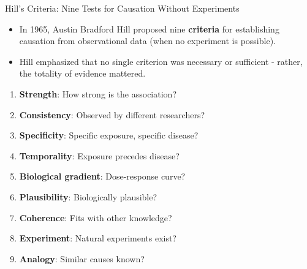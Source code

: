 \documentclass{beamer}
\begin{document}
	\begin{frame}{Hill's Criteria: Nine Tests for Causation Without Experiments}
		\begin{itemize}
			\item In 1965, Austin Bradford Hill proposed nine \textbf{criteria} for establishing causation from observational data (when no experiment is possible).
			\item Hill emphasized that no single criterion was necessary or sufficient - rather, the totality of evidence mattered.
		\end{itemize}
		
		\begin{example}
			\scriptsize
			\begin{enumerate}
				\item \textbf{Strength}: How strong is the association?
				\item \textbf{Consistency}: Observed by different researchers?
				\item \textbf{Specificity}: Specific exposure, specific disease?
				\item \textbf{Temporality}: Exposure precedes disease?
				\item \textbf{Biological gradient}: Dose-response curve?
				\item \textbf{Plausibility}: Biologically plausible?
				\item \textbf{Coherence}: Fits with other knowledge?
				\item \textbf{Experiment}: Natural experiments exist?
				\item \textbf{Analogy}: Similar causes known?
			\end{enumerate}
		\end{example}
	\end{frame}
	
\end{document}
